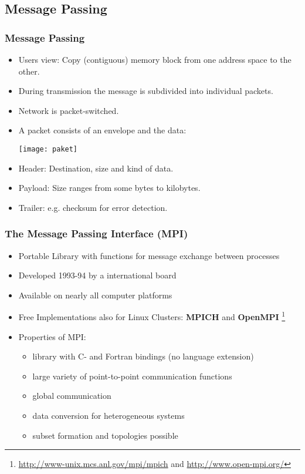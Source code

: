 \subsection{Message Passing}
\begin{frame}
\frametitle<presentation>{Message Passing}

\begin{itemize}
\item Users view: Copy (contiguous) memory block from one address space to the
  other.
\item During transmission the message is subdivided into individual packets.
\item Network is packet-switched.
\item A packet consists of an envelope and
  the data:
\begin{center}
  \texttt{[image: paket]}
\end{center}
\item Header: Destination, size and kind of data.
\item Payload: Size ranges from some bytes to kilobytes.
\item Trailer: e.g. checksum for error detection.
\end{itemize}
\end{frame}

\begin{frame}
\frametitle{The Message Passing Interface (MPI)}

\begin{itemize}
\item Portable Library with functions for message exchange between processes
\item Developed 1993-94 by a international board
\item Available on nearly all computer platforms
\item Free Implementations also for Linux Clusters: {\bfseries MPICH}
 and {\bfseries OpenMPI} \footnote{\tiny \url{http://www-unix.mcs.anl.gov/mpi/mpich} and \url{http://www.open-mpi.org/}}
\item Properties of MPI:
\begin{itemize}
\item library with C- and Fortran bindings (no language extension)
\item large variety of point-to-point communication functions
\item global communication
\item data conversion for heterogeneous systems
\item subset formation and topologies possible
\end{itemize}
\end{itemize}
\end{frame}

